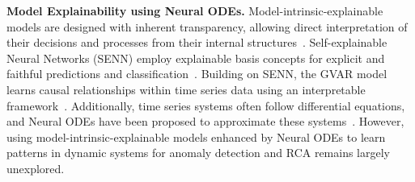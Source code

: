 \textbf{Model Explainability using Neural ODEs.} 
Model-intrinsic-explainable models are designed with inherent transparency, allowing direct interpretation of their decisions and processes from their internal structures~\cite{Lakkaraju2016,Lou2012}. Self-explainable Neural Networks (SENN) employ explainable basis concepts for explicit and faithful predictions and classification~\cite{alvarez2018towards}. 
Building on SENN, the GVAR model learns causal relationships within time series data using an interpretable framework~\cite{marcinkevivcs2021interpretable}. 
Additionally, time series systems often follow differential equations, and Neural ODEs have been proposed to approximate these systems~\cite { jia2019neural, asikis2022neural}. 
However, using model-intrinsic-explainable models enhanced by Neural ODEs to learn patterns in dynamic systems for anomaly detection and RCA remains largely unexplored.
